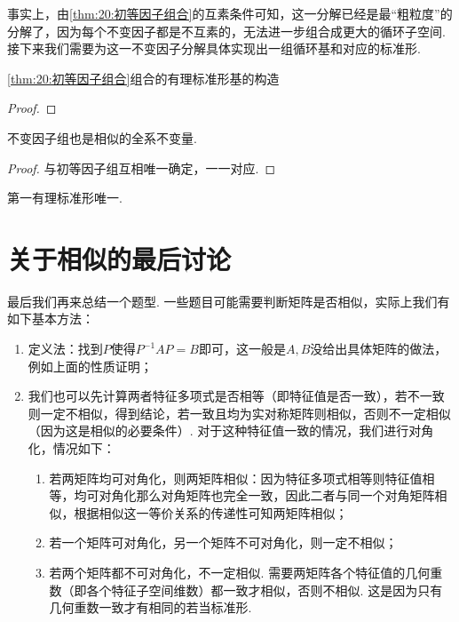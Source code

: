 事实上，由\autoref{thm:20:初等因子组合}的互素条件可知，这一分解已经是最``粗粒度''的分解了，因为每个不变因子都是不互素的，无法进一步组合成更大的循环子空间. 接下来我们需要为这一不变因子分解具体实现出一组循环基和对应的标准形.

\begin{theorem}
    \autoref{thm:20:初等因子组合}组合的有理标准形基的构造
\end{theorem}
\begin{proof}

\end{proof}

\begin{theorem}
    不变因子组也是相似的全系不变量.
\end{theorem}
\begin{proof}
    与初等因子组互相唯一确定，一一对应.
\end{proof}

\begin{corollary}
    第一有理标准形唯一.
\end{corollary}

\section{关于相似的最后讨论}

最后我们再来总结一个题型. 一些题目可能需要判断矩阵是否相似，实际上我们有如下基本方法：
\begin{enumerate}
    \item 定义法：找到$P$使得$P^{-1}AP=B$即可，这一般是$A,B$没给出具体矩阵的做法，例如上面的性质证明；

    \item 我们也可以先计算两者特征多项式是否相等（即特征值是否一致），若不一致则一定不相似，得到结论，若一致且均为实对称矩阵则相似，否则不一定相似（因为这是相似的必要条件）. 对于这种特征值一致的情况，我们进行对角化，情况如下：
          \begin{enumerate}
              \item 若两矩阵均可对角化，则两矩阵相似：因为特征多项式相等则特征值相等，均可对角化那么对角矩阵也完全一致，因此二者与同一个对角矩阵相似，根据相似这一等价关系的传递性可知两矩阵相似；

              \item 若一个矩阵可对角化，另一个矩阵不可对角化，则一定不相似；

              \item 若两个矩阵都不可对角化，不一定相似. 需要两矩阵各个特征值的几何重数（即各个特征子空间维数）都一致才相似，否则不相似. 这是因为只有几何重数一致才有相同的若当标准形.
          \end{enumerate}
\end{enumerate}

